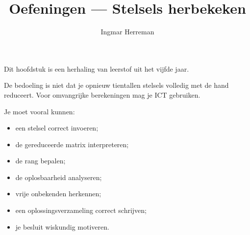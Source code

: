 \documentclass{ximera}
\title{Oefeningen — Stelsels herbekeken}
\author{Ingmar Herreman}
\begin{document}







\maketitle

\FVDbeginExercises


\begin{opmerking}
Dit hoofdstuk is een herhaling van leerstof uit het vijfde jaar.

De bedoeling is niet dat je opnieuw tientallen stelsels volledig
met de hand reduceert. Voor omvangrijke berekeningen mag je ICT gebruiken.

Je moet vooral kunnen:

\begin{itemize}
    \item een stelsel correct invoeren;
    \item de gereduceerde matrix interpreteren;
    \item de rang bepalen;
    \item de oplosbaarheid analyseren;
    \item vrije onbekenden herkennen;
    \item een oplossingsverzameling correct schrijven;
    \item je besluit wiskundig motiveren.
\end{itemize}
\end{opmerking}





\end{document}
